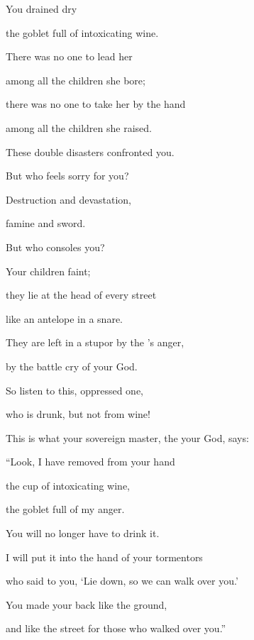 {\par }{\Q You drained dry
\par }{\Q the goblet
full of intoxicating wine.
\par }{\Q {}There was no
one to lead
her
\par }{\Q among all
the children
she bore;
\par }{\Q there was no
one to take
her by the hand
\par }{\Q among all
the children
she raised.
\par }{\Q {}These
double
disasters confronted
you.
\par }{\Q But who
feels sorry
for you?
\par }{\Q Destruction
and devastation,
\par }{\Q famine
and sword.
\par }{\Q But who
consoles you?
\par }{\Q {}Your children
faint;
\par }{\Q they lie
at the head
of every
street
\par }{\Q like an antelope
in a snare.
\par }{\Q They are left in a stupor
by the
{}’s
anger,
\par }{\Q by the battle cry
of your God.
\par }{\Q {}So
listen
to this,
oppressed
one,
\par }{\Q who is drunk,
but not
from wine!
\par }{\Q {}This is what
your sovereign master,
the {}
your God,
says:
\par }{\Q “Look,
I have removed
from your hand
\par }{\Q the cup
of intoxicating wine,
\par }{\Q the goblet
full of my anger.
\par }{\Q You will no
longer
have to drink it.
\par }{\Q {}I will put
it into the hand
of your tormentors
\par }{\Q who
said
to you, ‘Lie down,
so we can walk over
you.’
\par }{\Q You made
your back
like the ground,
\par }{\Q and like the street
for those who walked over you.”

\par }
